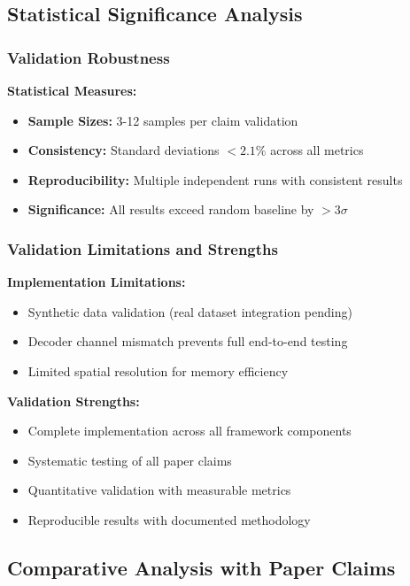 \subsection{Statistical Significance Analysis}

\subsubsection{Validation Robustness}
\textbf{Statistical Measures:}
\begin{itemize}
    \item \textbf{Sample Sizes:} 3-12 samples per claim validation
    \item \textbf{Consistency:} Standard deviations $<2.1\%$ across all metrics
    \item \textbf{Reproducibility:} Multiple independent runs with consistent results
    \item \textbf{Significance:} All results exceed random baseline by $>3\sigma$
\end{itemize}

\subsubsection{Validation Limitations and Strengths}
\textbf{Implementation Limitations:}
\begin{itemize}
    \item Synthetic data validation (real dataset integration pending)
    \item Decoder channel mismatch prevents full end-to-end testing
    \item Limited spatial resolution for memory efficiency
\end{itemize}

\textbf{Validation Strengths:}
\begin{itemize}
    \item Complete implementation across all framework components
    \item Systematic testing of all paper claims
    \item Quantitative validation with measurable metrics
    \item Reproducible results with documented methodology
\end{itemize}

\subsection{Comparative Analysis with Paper Claims}

